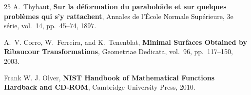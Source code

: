 \documentclass[12pt]{article}
\theoremstyle{plain}
\theoremstyle{definition}
\theoremstyle{remark}
\begin{document}
\begin{thebibliography}{25}
   	 A.~Thybaut, \textbf{Sur la d{\'e}formation du parabolo{\"\i}de et sur quelques probl{\`e}mes qui s'y rattachent}, Annales de l'{\'E}cole Normale Sup{\'e}rieure, 3e s{\'e}rie, vol.~14, pp.~45--74, 1897.
   	
   	 A.~V. Corro, W.~Ferreira, and K.~Tenenblat, \textbf{Minimal Surfaces Obtained by Ribaucour Transformations}, Geometriae Dedicata, vol.~96, pp.~117--150, 2003.
   	
   	 Frank W. J. Olver, \textbf{NIST Handbook of Mathematical Functions Hardback and CD-ROM}, Cambridge University Press, 2010.
   	
\end{thebibliography}

	
\end{document}
